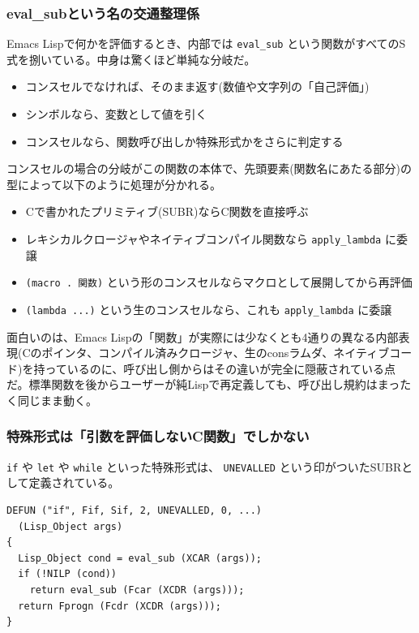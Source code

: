 \documentclass[11pt]{article}
\begin{document}
\subsubsection{eval\_subという名の交通整理係}
\label{sec:orgfb634b2}

Emacs Lispで何かを評価するとき、内部では \texttt{eval\_sub} という関数がすべてのS式を捌いている。中身は驚くほど単純な分岐だ。

\begin{itemize}
\item コンスセルでなければ、そのまま返す(数値や文字列の「自己評価」)
\item シンボルなら、変数として値を引く
\item コンスセルなら、関数呼び出しか特殊形式かをさらに判定する
\end{itemize}

コンスセルの場合の分岐がこの関数の本体で、先頭要素(関数名にあたる部分)の型によって以下のように処理が分かれる。

\begin{itemize}
\item Cで書かれたプリミティブ(SUBR)ならC関数を直接呼ぶ
\item レキシカルクロージャやネイティブコンパイル関数なら \texttt{apply\_lambda} に委譲
\item \texttt{(macro . 関数)} という形のコンスセルならマクロとして展開してから再評価
\item \texttt{(lambda ...)} という生のコンスセルなら、これも \texttt{apply\_lambda} に委譲
\end{itemize}

面白いのは、Emacs Lispの「関数」が実際には少なくとも4通りの異なる内部表現(Cのポインタ、コンパイル済みクロージャ、生のconsラムダ、ネイティブコード)を持っているのに、呼び出し側からはその違いが完全に隠蔽されている点だ。標準関数を後からユーザーが純Lispで再定義しても、呼び出し規約はまったく同じまま動く。
\subsubsection{特殊形式は「引数を評価しないC関数」でしかない}
\label{sec:org0601ad0}

\texttt{if} や \texttt{let} や \texttt{while} といった特殊形式は、 \texttt{UNEVALLED} という印がついたSUBRとして定義されている。

\begin{verbatim}
DEFUN ("if", Fif, Sif, 2, UNEVALLED, 0, ...)
  (Lisp_Object args)
{
  Lisp_Object cond = eval_sub (XCAR (args));
  if (!NILP (cond))
    return eval_sub (Fcar (XCDR (args)));
  return Fprogn (Fcdr (XCDR (args)));
}
\end{verbatim}
\end{document}
